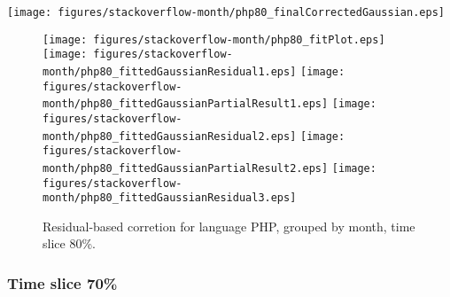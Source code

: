 \begin{center}
{\texttt{[image: figures/stackoverflow-month/php80\_finalCorrectedGaussian.eps]}}
\end{center}

\FloatBarrier

\begin{figure}[t]
\centering
{}
{\texttt{[image: figures/stackoverflow-month/php80\_fitPlot.eps]}}
{\texttt{[image: figures/stackoverflow-month/php80\_fittedGaussianResidual1.eps]}}
{\texttt{[image: figures/stackoverflow-month/php80\_fittedGaussianPartialResult1.eps]}}
{\texttt{[image: figures/stackoverflow-month/php80\_fittedGaussianResidual2.eps]}}
{\texttt{[image: figures/stackoverflow-month/php80\_fittedGaussianPartialResult2.eps]}}
{\texttt{[image: figures/stackoverflow-month/php80\_fittedGaussianResidual3.eps]}}
\caption{Residual-based corretion for language PHP, grouped by month, time slice 80\%.}
\end{figure}


\FloatBarrier


\subsubsection{Time slice 70\%}

